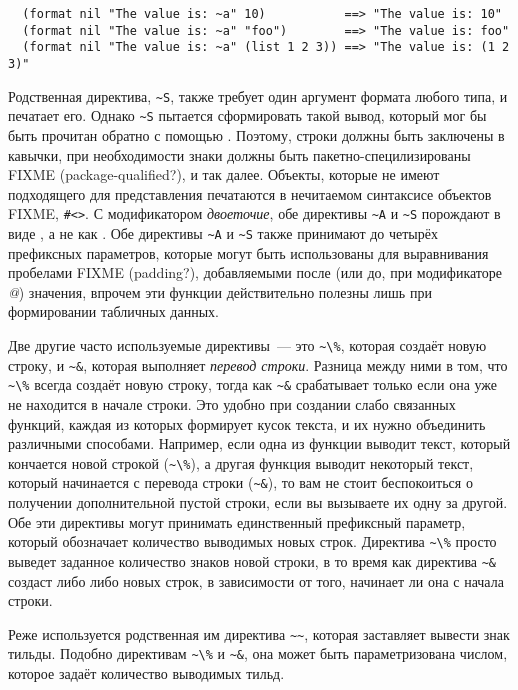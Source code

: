 {\begin{verbatim}
  (format nil "The value is: ~a" 10)           ==> "The value is: 10"
  (format nil "The value is: ~a" "foo")        ==> "The value is: foo"
  (format nil "The value is: ~a" (list 1 2 3)) ==> "The value is: (1 2 3)"
\end{verbatim}

Родственная директива, \lstinline!~S!, также требует один аргумент формата любого типа, и
печатает его. Однако \lstinline!~S!  пытается сформировать такой вывод, который мог бы
быть прочитан обратно с помощью . Поэтому, строки должны быть заключены в
кавычки, при необходимости знаки должны быть пакетно-специлизированы FIXME
(package-qualified?), и так далее. Объекты, которые не имеют подходящего для 
представления печатаются в нечитаемом синтаксисе объектов FIXME, \lstinline!#<>!. С
модификатором \textit{двоеточие}, обе директивы \lstinline!~A! и \lstinline!~S!  порождают
 в виде \code{()}, а не как . Обе директивы \lstinline!~A! и
\lstinline!~S! также принимают до четырёх префиксных параметров, которые могут быть
использованы для выравнивания пробелами FIXME (padding?), добавляемыми после (или до, при
модификаторе \textit{@}) значения, впрочем эти функции действительно полезны лишь при
формировании табличных данных.

Две другие часто используемые директивы~--- это \lstinline!~\%!, которая создаёт новую
строку, и \lstinline!~&!, которая выполняет \textit{перевод строки}. Разница между ними в
том, что \lstinline!~\%! всегда создаёт новую строку, тогда как \lstinline!~&!
срабатывает только если она уже не находится в начале строки. Это удобно при создании
слабо связанных функций, каждая из которых формирует кусок текста, и их нужно объединить
различными способами. Например, если одна из функции выводит текст, который кончается
новой строкой (\lstinline!~\%!), а другая функция выводит некоторый текст, который
начинается с перевода строки (\lstinline!~&!), то вам не стоит беспокоиться о получении
дополнительной пустой строки, если вы вызываете их одну за другой. Обе эти директивы могут
принимать единственный префиксный параметр, который обозначает количество выводимых новых
строк. Директива \lstinline!~\%! просто выведет заданное количество знаков новой строки, в
то время как директива \lstinline!~&! создаст либо  либо  новых строк,
в зависимости от того, начинает ли она с начала строки.

Реже используется родственная им директива \lstinline!~~!, которая заставляет
 вывести знак тильды. Подобно директивам \lstinline!~\%! и \lstinline!~&!,
она может быть параметризована числом, которое задаёт количество выводимых тильд.

}
